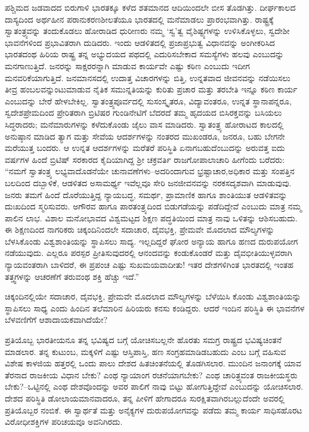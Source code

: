 ಪಶ್ಚಿಮದ ಜಡವಾದದ ಬಿರುಗಾಳಿ ಭಾರತಕ್ಕೂ ಕಳೆದ ಶತಮಾನದ ಆದಿಯಿಂದಲೇ ಬೀಸ ತೊಡಗಿತ್ತು. ದೀರ್ಘಕಾಲದ ದಾಸ್ಯದಿಂದ ಅರ್ಥಹೀನ ಪರಾನುಕರಣಶೀಲತೆಯೂ ಭಾರತದಲ್ಲಿ ಮನೆಮಾಡಲು ಪ್ರಾರಂಭವಾಗಿತ್ತು. ರಾಷ್ಟ್ರಕ್ಕೆ ಸ್ವಾತಂತ್ರ್ಯವನ್ನು ತಂದುಕೊಡಲು ಹೋರಾಡಿದ ಧುರೀಣರು ನಮ್ಮ ‘ಸ್ವ’ತ್ವ ವೈಶಿಷ್ಟ್ಯಗಳನ್ನು ಉಳಿಸಿಕೊಳ್ಳಲು, ಸ್ವದೇಶೀ ಭಾವನೆಗಳಿಂದ ಪ್ರಭಾವಿತ\-ರಾಗಿ ದುಡಿದರು. ಇಂದು ಆಡಳಿತದಲ್ಲಿ ಪ್ರಜಾಪ್ರಭುತ್ವ ವಿಧಾನವನ್ನು ಅಂಗೀಕರಿಸಿದ ಭಾರತದಂಥ ಹಿರಿಯ ರಾಷ್ಟ್ರ ತನ್ನ ಅಭ್ಯುದಯದ ಪಥದಲ್ಲಿ ಎದುರಿಸಬೇಕಾದ ಸಮಸ್ಯೆಗಳು ಹಲವು ಎಂಬುದನ್ನು ಮನಗಾಣುತ್ತಿದೆ. ಜನರನ್ನು ಸಾಕ್ಷರರನ್ನಾಗಿ ಮಾಡುವ ಕಾರ್ಯವೇ ಎಷ್ಟು ಕಠಿಣ ಎಂಬುದು ಇದೀಗ ಮನವರಿಕೆಯಾಗುತ್ತಿದೆ. ಜನಮಾನಸದಲ್ಲಿ ಉದಾತ್ತ ವಿಚಾರಗಳನ್ನು ಬಿತ್ತಿ, ಉನ್ನತವಾದ ಜೀವನವನ್ನು ನಡೆಯಿಸಲು ತೀವ್ರ ಹಂಬಲವನ್ನುಂಟುಮಾಡುವ ನೈತಿಕ ಸಮುನ್ನತಿಯನ್ನು ಕುರಿತು ಪ್ರಚಾರ ಮತ್ತು ತರಬೇತಿ ಇನ್ನೂ ಕಠಿಣ ಕಾರ್ಯ ಎಂಬುದನ್ನು ಬೇರೆ ಹೇಳಬೇಕಿಲ್ಲ. ಸ್ವಾತಂತ್ರ್ಯಪೂರ್ವದಲ್ಲಿ ಸುಸಂಸ್ಕೃತರೂ, ವಿದ್ಯಾವಂತರೂ, ಉನ್ನತ ಸ್ಥಾನಾಪನ್ನರೂ, ಸ್ವದೇಶಪ್ರೇಮದಿಂದ ಪ್ರೇರಿತರಾಗಿ ಬ್ರಿಟಿಷರ ಗುಂಡಿನೇಟಿಗೆ ಬೆದರದೆ ತಮ್ಮ ಹೃದಯದ ಬಿಸಿರಕ್ತವನ್ನು ಬಸಿಯಲು ಸಿದ್ಧರಾದರು; ಮನೆಮಾರುಗಳನ್ನು ಕಳೆದುಕೊಂಡು ಜೈಲು ವಾಸ ಮಾಡಿದರು. ಸ್ವಾತಂತ್ರ್ಯ ಹೋರಾಟದ ಕಾಲದಲ್ಲಿ ಅನುಷ್ಠಾನ ಮಾಡಿದ ತ್ಯಾಗ ಮತ್ತು ಸೇವೆಯ ಆದರ್ಶಗಳನ್ನು ನಂತರದ ಮುಖಂಡರೂ, ಜನರೂ, ಬಹು ಬೇಗನೇ ಮರೆಯುತ್ತ ಬಂದರು. ಆ ಉನ್ನತ ಆದರ್ಶಗಳನ್ನು ಮರೆತರೆ ಪರಿಸ್ಥಿತಿ ಏನಾಗಬಹುದೆಂಬುದನ್ನು ಅರುವತ್ತ ಐದು ವರ್ಷಗಳ ಹಿಂದೆ ಬ್ರಿಟಿಷ್ ಸರಕಾರದ ಕೈದಿಯಾಗಿದ್ದ ಶ‍್ರೀ ಚಕ್ರವರ್ತಿ ರಾಜಗೋಪಾಲಾಚಾರಿ ಹೀಗೆಂದು ಬರೆದರು: “ನಮಗೆ ಸ್ವಾತಂತ್ರ್ಯ ಲಭ್ಯವಾದೊಡನೆಯೇ ಚುನಾವಣೆಗಳು–ಅದರಿಂದಾಗುವ ಭ್ರಷ್ಟಾಚಾರ,\break ಅಧಿಕಾರ ಮತ್ತು ಸಂಪತ್ತಿನ ಬಲದಿಂದ ದಬ್ಬಾಳಿಕೆ, ಆಡಳಿತದ ಅಸಾಮರ್ಥ್ಯ ಇವೆಲ್ಲವೂ ಸೇರಿ ಜನಜೀವನವನ್ನು ನರಕಸದೃಶವಾಗಿ ಮಾಡುವುವು. ಜನರು ತಮಗೆ ಹಿಂದೆ ದೊರೆಯುತ್ತಿದ್ದ ನ್ಯಾಯಬದ್ಧ, ಸಮರ್ಥ, ಪ್ರಾಮಾಣಿಕ ಹಾಗೂ ಶಾಂತಿಯುತ ಆಡಳಿತವನ್ನು ದುಃಖದಿಂದ ಸ್ಮರಿಸುವರು. ಅಗೌರವ ಹಾಗೂ ಪಾರತಂತ್ರ್ಯದಿಂದ ಬಿಡುಗಡೆಯನ್ನು ಪಡೆದಿದ್ದೇವೆ ಎಂಬುದು ಮಾತ್ರ ನಮ್ಮ ಪಾಲಿನ ಲಾಭ. ವಿಶಾಲ ಮನೋಭಾವದ ವಿಶ್ವಮಟ್ಟದ ಶಿಕ್ಷಣ ಪದ್ಧತಿಯಿಂದ ಮಾತ್ರ ನಾವು ಒಳಿತನ್ನು ಆಶಿಸಬಹುದು. ಈ ಶಿಕ್ಷಣದಿಂದ ನಾಗರಿಕರು ಚಿಕ್ಕಂದಿನಿಂದಲೇ ಸದಾ\-ಚಾರ, ದೈವಭಕ್ತಿ, ಪ್ರೇಮವೇ ಮೊದಲಾದ ಮೌಲ್ಯಗಳನ್ನು ಬೆಳಸಿಕೊಂಡು ವಿಶ್ವಶಾಂತಿಯನ್ನು ಸ್ಥಾಪಿಸಲು ಸಾದ್ಯ. ಇಲ್ಲದಿದ್ದರೆ ಘೋರ ಅನ್ಯಾಯ ಹಾಗೂ ಹಣದ ದುರುಪಯೋಗ ನಡೆಯುವುದು. ಎಲ್ಲರೂ ಪರಸ್ಪರ ಪ್ರೀತಿಸುವುದರಲ್ಲಿ ಆನಂದವನ್ನು ಕಂಡುಕೊಂಡರೆ ಮತ್ತು ದೈವಭೀತಿಯುಳ್ಳವರಾಗಿ ನ್ಯಾಯವಂತರಾಗಿ ಬಾಳಿದರೆ, ಈ ಪ್ರಪಂಚ ಎಷ್ಟು ಸುಖಮಯ\-\break ವಾದೀತು! ಇತರ ದೇಶಗಳಿಗಿಂತ ಭಾರತದಲ್ಲಿ ಇಂತಹ ತತ್ತ್ವಗಳನ್ನು ಆಚರಣೆಗೆ ತರುವಂಥ ಶಕ್ತಿ ಹೆಚ್ಚು ಇದೆ.”

ಚಿಕ್ಕಂದಿನಲ್ಲಿಯೇ ಸದಾಚಾರ, ದೈವಭಕ್ತಿ, ಪ್ರೇಮವೇ ಮೊದಲಾದ ಮೌಲ್ಯಗಳನ್ನು ಬೆಳೆಯಿಸಿ ಕೊಂಡು ವಿಶ್ವಶಾಂತಿಯನ್ನು ಸ್ಥಾಪಿಸಲು ಸಾಧ್ಯ ಎಂದು ಹಿಂದಿನ ತಲೆಮಾರಿನ ಹಿರಿಯರು ಕನಸು ಕಂಡಿದ್ದರು. ಆದರೆ ಇಂದಿನ ಪರಿಸ್ಥಿತಿ ಈ ಭಾವನೆಗಳ ಬೆಳವಣಿಗೆಗೆ ಆಶಾದಾಯಕವಾಗಿದೆಯೇ?

ಪ್ರತಿಯೊಬ್ಬ ಭಾರತೀಯನೂ ತನ್ನ ಭವಿಷ್ಯದ ಬಗ್ಗೆ ಯೋಚಿಸಬಲ್ಲನೇ ಹೊರತು ಸಮಗ್ರ ರಾಷ್ಟ್ರದ ಭವಿಷ್ಯಚಿಂತನೆ ಮಾಡಲಾರ. ತನ್ನ ಕುಟುಂಬ, ಮಕ್ಕಳಿಗೆ ಎಷ್ಟು ಆಸ್ತಿಪಾಸ್ತಿ, ಹಣ ಸಂಗ್ರಹಮಾಡಿಡಬಹುದು ಎಂಬ ಬಗ್ಗೆ ವಹಿಸುವ ವಿಶೇಷ ಕಾಳಜಿಯ ಹತ್ತರಲ್ಲಿ ಒಂದು ಪಾಲು ದೇಶದ ಹಿತಚಿಂತನೆಯಲ್ಲಿ ತೊಡಗಿಸಲಾರ. ಮುಂದಿನ ಜನಾಂಗಕ್ಕೆ ಯಾವ ತೆರನಾದ ರಾಜಕೀಯ ವಿಧಾನ ಬೇಕು? ಎಂಥ ನ್ಯಾಯಾಂಗ ರಚನೆಯಾಗಬೇಕು? ಎಂಥ ಚಾರಿತ್ರ್ಯವಂತ ರಾಜಕೀಯಸ್ಥರು ಬೇಕು?–ಒಟ್ಟಿನಲ್ಲಿ ಎಂಥ ದೇಶವೊಂದನ್ನು ಅವರ ಪಾಲಿಗೆ ನಾವು ಬಿಟ್ಟು ಹೋಗುತ್ತಿದ್ದೇವೆ ಎಂಬುದನ್ನು ಯೋಚಿಸಲಾರ. ದೇಶದ ಪರಿಸ್ಥಿತಿ ಡೋಲಾಯಮಾನವಾದರೂ, ತನ್ನ ಪೀಳಿಗೆ ಹೇಗಾದರೂ ಸುರಕ್ಷಿತವಾಗಿರಬಲ್ಲುದೆಂದೇ ಅವರಲ್ಲಿ ಪ್ರತಿಯೊಬ್ಬರ ನಂಬಿಕೆ. ಈ ಸ್ವಾರ್ಥತೆ ಮತ್ತು ಅನೈಕ್ಯಗಳ ದುರುಪಯೋಗವನ್ನು ಪಡೆದು ತಮ್ಮ ಕಾರ್ಯ ಸಾಧಿಸಹೊರಟ ವಿರೋಧೀಶಕ್ತಿಗಳ ಪರಿಚಯವೂ ಅವನಿಗಿರದು.

